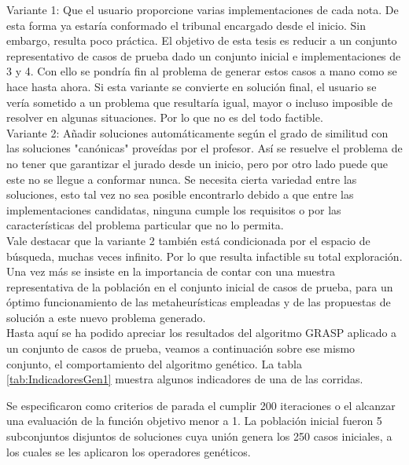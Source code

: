\documentclass[a4paper,12pt]{book}
\begin{document}
 	Variante 1: Que el usuario proporcione varias implementaciones de cada nota. De esta forma ya estaría conformado el tribunal encargado desde el inicio. Sin embargo, resulta poco práctica. El objetivo de esta tesis es reducir a un conjunto representativo de casos de prueba dado un conjunto inicial e implementaciones de 3 y 4. Con ello se pondría fin al problema de generar estos casos a mano como se hace hasta ahora. Si esta variante se convierte en solución final, el usuario se vería sometido a un problema que resultaría igual, mayor o incluso imposible de resolver en algunas situaciones. Por lo que no es del todo factible. \\
	
	Variante 2: Añadir soluciones automáticamente según el grado de similitud con las soluciones "canónicas" proveídas por el profesor. Así se resuelve el problema de no tener que garantizar el jurado desde un inicio, pero por otro lado puede que este no se llegue a conformar nunca. Se necesita cierta variedad entre las soluciones, esto tal vez no sea posible encontrarlo debido a que entre las implementaciones candidatas, ninguna cumple los requisitos o por las características del problema particular que no lo permita. \\
	
	Vale destacar que la variante 2 también está condicionada por el espacio de búsqueda, muchas veces infinito. Por lo que resulta infactible su total exploración. Una vez más se insiste en la importancia de contar con una muestra representativa de la población en el conjunto inicial de casos de prueba, para un óptimo funcionamiento de las metaheurísticas empleadas y de las propuestas de solución a este nuevo problema generado. \\
	
	Hasta aquí se ha podido apreciar los resultados del algoritmo GRASP aplicado a un conjunto de casos de prueba, veamos a continuación sobre ese mismo conjunto, el comportamiento del algoritmo genético. La tabla \ref{tab:IndicadoresGen1} muestra algunos indicadores de una de las corridas.
	
	Se especificaron como criterios de parada el cumplir 200 iteraciones o el alcanzar una evaluación de la función objetivo menor a 1. La población inicial fueron 5 subconjuntos disjuntos de soluciones cuya unión genera los 250 casos iniciales, a los cuales se les aplicaron los operadores genéticos. 
	
\end{document}
